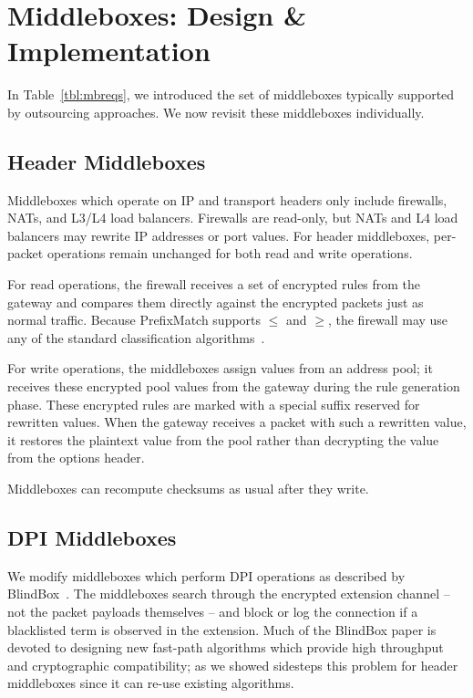 

\section{Middleboxes: Design \& Implementation}
\label{sec:mbs}

In Table~\ref{tbl:mbreqs}, we introduced the set of middleboxes typically supported by outsourcing approaches. We now revisit these middleboxes individually. %

\subsection{Header Middleboxes}
Middleboxes which operate on IP and transport headers only include firewalls, NATs, and L3/L4 load balancers.
Firewalls are read-only, but NATs and L4 load balancers may rewrite IP addresses or port values. 
For header middleboxes, per-packet operations remain unchanged for both read and write operations.

For read operations, the firewall receives a set of encrypted rules from the gateway and compares them directly against the encrypted packets just as normal traffic. Because PrefixMatch supports $\leq$ and $\geq$, the firewall may use any of the standard classification algorithms~\cite{packet_classif}.

For write operations, the middleboxes assign values from an address pool; it receives these encrypted pool values from the gateway during the rule generation phase.
These encrypted rules are marked with a special suffix reserved for rewritten values.
When the gateway receives a packet with such a rewritten value, it restores the plaintext value from the pool rather than decrypting the value from the options header.

Middleboxes can recompute checksums as usual after they write.

\subsection{DPI Middleboxes}
We modify middleboxes which perform DPI operations as described by BlindBox~\cite{blindbox}. 
The middleboxes search through the encrypted extension channel -- not the packet payloads themselves -- and block or log the connection if a blacklisted term is observed in the extension.
Much of the BlindBox paper is devoted to designing new fast-path algorithms which provide high throughput and cryptographic compatibility; as we showed \sys sidesteps this problem for header middleboxes since it can re-use existing algorithms.


